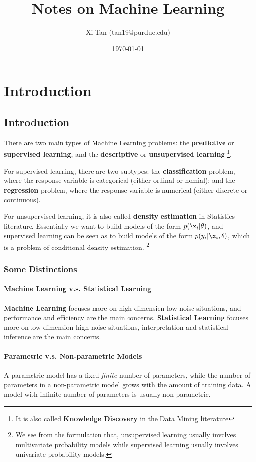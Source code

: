 \documentclass{book}
\title{Notes on Machine Learning}
\author{Xi Tan (tan19@purdue.edu)}
\date{\today}
\begin{document}
\maketitle
\tableofcontents
\part{Introduction}
\chapter{Introduction}
There are two main types of Machine Learning problems: the {\bf{predictive}} or {\bf{supervised learning}}, and the {\bf{descriptive}} or {\bf{unsupervised learning}} \footnote{It is also called {\bf{Knowledge Discovery}} in the Data Mining literature}.

For supervised learning, there are two subtypes: the {\bf{classification}} problem, where the response variable is categorical (either ordinal or nomial); and the {\bf{regression}} problem, where the response variable is numerical (either discrete or continuous).

For unsupervised learning, it is also called {\bf{density estimation}} in Statistics literature. Essentially we want to build models of the form $p(\x_i|\theta)$, and supervised learning can be seen as to build models of the form $p(y_i|\x_i,\theta)$, which is a problem of conditional density estimation. \footnote{We see from the formulation that, unsupervised learning usually involves multivariate probability models while supervised learning usually involves univariate probability models.}


\section{Some Distinctions}
\subsection{Machine Learning v.s. Statistical Learning}
{\bf{Machine Learning}} focuses more on high dimension low noise situations, and performance and efficiency are the main concerns. {\bf{Statistical Learning}} focuses more on low dimension high noise situations, interpretation and statistical inference are the main concerns.
\subsection{Parametric v.s. Non-parametric Models}
A parametric model has a fixed {\em{finite}} number of parameters, while the number of parameters in a non-parametric model grows with the amount of training data. A model with infinite number of parameters is usually non-parametric.
\end{document}

